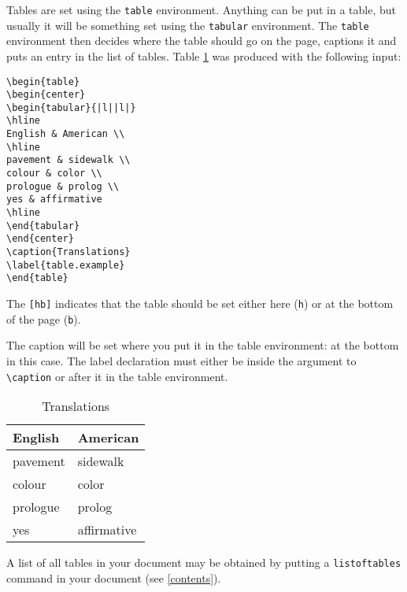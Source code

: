 Tables are set using the \verb|table| environment.
Anything can be put in a table, but usually it will be something set
using the \verb|tabular| environment.
The \verb|table| environment then decides where the table should go on the
page, captions it and puts an entry in the list of tables.
Table \ref{table.example} was produced with the following input:
\begin{verbatim}
\begin{table}
\begin{center}
\begin{tabular}{|l||l|}
\hline
English & American \\
\hline
pavement & sidewalk \\
colour & color \\
prologue & prolog \\
yes & affirmative
\hline
\end{tabular}
\end{center}
\caption{Translations}
\label{table.example}
\end{table}
\end{verbatim}

The \verb|[hb]| indicates that the table should be set either here
(\verb|h|) or at the bottom of the page (\verb|b|).

The caption will be set where you put it in the table environment: at the
bottom in this case.
The label declaration must either be inside the argument to \verb|\caption|
or after it in the table environment.

\begin{table}[hb]
\begin{center}
\begin{tabular}{|l||l|}
\hline
English & American \\
\hline
pavement & sidewalk \\
colour & color \\
prologue & prolog \\
yes & affirmative \\
\hline
\end{tabular}
\end{center}
\caption{Translations}
\label{table.example}
\end{table}

A list of all tables in your document may be obtained by putting a
\verb|listoftables| command in your document (see \ref{contents}).

